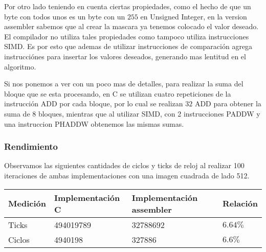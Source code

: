 Por otro lado teniendo en cuenta ciertas propiedades, como el hecho de que un byte con todos unos es un byte con un $255$ en Unsigned Integer, en la version assembler sabemos que al crear la mascara ya tenemos colocado el valor deseado. El compilador no utiliza tales propiedades como tampoco utiliza instrucciones SIMD. Es por esto que ademas de utilizar instrucciones de comparación agrega instrucciónes para insertar los valores deseados, generando mas lentitud en el algoritmo. 

Si nos ponemos a ver con un poco mas de detalles, para realizar la suma del bloque que se esta procesando, en C se utilizan cuatro repeticiones de la instrucción ADD por cada bloque, por lo cual se realizan $32$ ADD para obtener la suma de 8 bloques, mientras que al utilizar SIMD, con 2 instrucciones PADDW y una instruccion PHADDW obtenemos las mismas sumas.

\subsubsection{Rendimiento}

Observamos las siguientes cantidades de ciclos y ticks de reloj al realizar 100 iteraciones de ambas implementaciones con una imagen cuadrada de lado 512.

\begin{center}
    \begin{tabular}{|l|l|l|l|}
        \hline
        Medición & Implementación C & Implementación assembler & Relación \\
        \hline
        Ticks    & 494019789      & 32788692               & $6.64\%$ \\
        Ciclos   & 4940198        & 327886                 & $6.6\%$ \\
        \hline
    \end{tabular}
\end{center}
